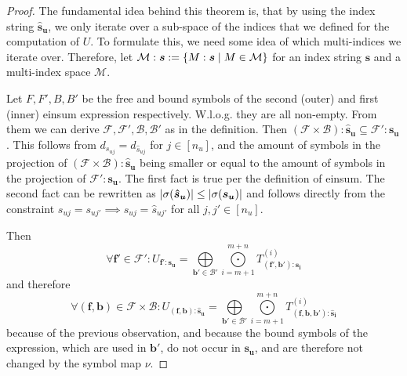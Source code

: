\begin{proof}
    \small
    The fundamental idea behind this theorem is, that by using the index string $\bm{\hat{s}_u}$, we only iterate over a sub-space of the indices that we defined for the computation of $U$.
    To formulate this, we need some idea of which multi-indices we iterate over.
    Therefore, let $\mathcal{M}:\bm{s} := \lbrace M: \bm{s} \mid M \in \mathcal{M} \rbrace$ for an index string $\bm{s}$ and a multi-index space $\mathcal{M}$.

    Let $F, F', B, B'$ be the free and bound symbols of the second (outer) and first (inner) einsum expression respectively.
    W.l.o.g. they are all non-empty.
    From them we can derive $\mathcal{F}, \mathcal{F}', \mathcal{B}, \mathcal{B}'$ as in the definition.
    Then $(\mathcal{F} \times \mathcal{B}):\bm{\hat{s}_u} \subseteq \mathcal{F}':\bm{s_u}$.
    This follows from $d_{s_{uj}} = d_{\hat{s}_{uj}}$ for $j \in [n_u]$,
    and the amount of symbols in the projection of $(\mathcal{F} \times \mathcal{B}):\bm{\hat{s}_u}$ being smaller or equal to the amount of symbols in the projection of $\mathcal{F}':\bm{s_u}$.
    The first fact is true per the definition of einsum.
    The second fact can be rewritten as $\left| \sigma(\bm{\hat{s}_u}) \right| \leq \left| \sigma(\bm{s_u}) \right|$ and follows directly from the constraint $s_{uj} = s_{uj'} \implies \hat{s}_{uj} = \hat{s}_{uj'}$ for all $j,j' \in [n_u]$.

    Then
    $$\forall \bm{f'} \in \mathcal{F}': U_{\bm{f'}: \bm{s_u}} = \bigoplus\limits_{\bm{b'} \in \mathcal{B}'}\bigodot\limits_{i = m + 1}^{m + n} T^{(i)}_{(\bm{f'}, \bm{b'}):\bm{s_{i}}}$$
    and therefore
    $$\forall (\bm{f}, \bm{b}) \in \mathcal{F} \times \mathcal{B}: U_{(\bm{f}, \bm{b}): \bm{\hat{s}_u}} = \bigoplus\limits_{\bm{b'} \in \mathcal{B}'}\bigodot\limits_{i = m + 1}^{m + n} T^{(i)}_{(\bm{f}, \bm{b}, \bm{b'}):\bm{\hat{s}_{i}}}$$
    because of the previous observation,
    and because the bound symbols of the expression, which are used in $\bm{b'}$, do not occur in $\bm{s_u}$, and are therefore not changed by the symbol map $\nu$.


\end{proof}
